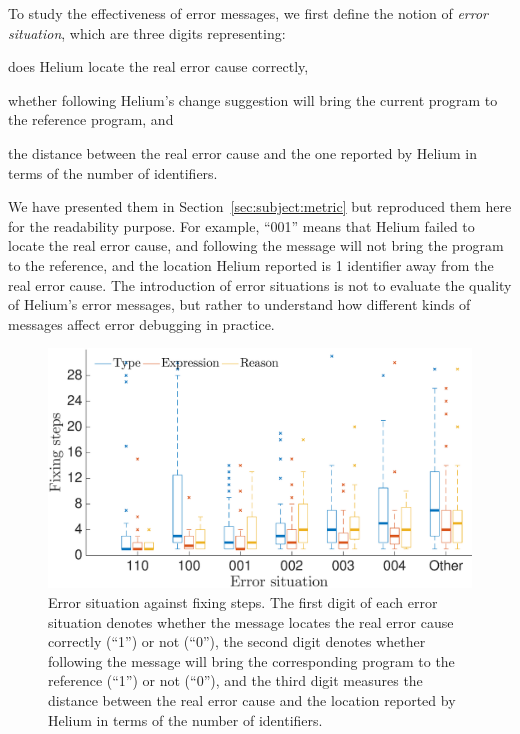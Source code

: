 \documentclass[12pt]{report}	%
\begin{document}
\noindent
To study the effectiveness of error messages,
we first define the notion of \emph{error situation}, which are three
digits representing:
\begin{enumerate*}[label=(\alph*)]
\item does Helium locate the real error cause correctly,
\item whether following Helium's change suggestion will bring
the current program to the reference program, and
\item the distance between the real error cause and the one reported
by Helium in terms of the number of identifiers.
\end{enumerate*}
%
We have presented them in Section~\ref{sec:subject:metric} but reproduced them
here for the readability purpose.
For example, ``001'' means that Helium failed to locate the real error cause,
and following the message will not bring the program to the reference,
and the location Helium reported is 1 identifier away from the
real error cause.
%
The introduction of error situations is not to evaluate
the quality of Helium's error messages,
but rather to understand how different kinds of messages
affect error debugging in practice.


\begin{figure}
\centering
\includegraphics[width=0.85\columnwidth]{images/step_test.eps}
\caption{Error situation against fixing steps. The first digit
of each error situation denotes whether the message locates
the real error cause correctly (``1'') or not (``0''), the
second digit denotes whether following the message will bring
the corresponding program to the reference (``1'') or not (``0''), 
and the third digit measures the distance between the real error
cause and the location reported by Helium in terms of 
the number of identifiers.}
\label{fig:errsitu1}
\end{figure}
\end{document}
